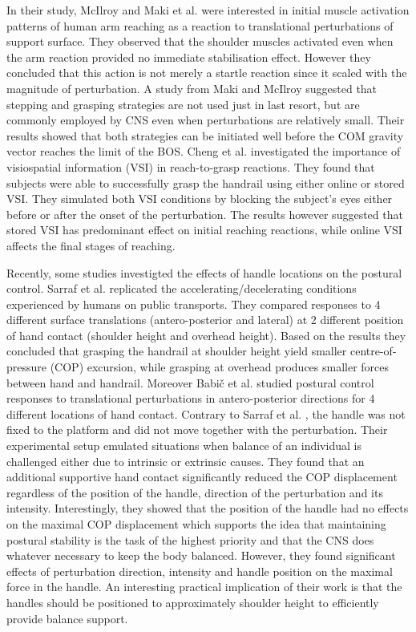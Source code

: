 \documentclass[12pt,a4paper,twoside]{article}
\begin{document}
In their study, McIlroy and Maki et al. \cite{Mcllroy1995b} were interested in initial muscle activation patterns of human arm reaching as a reaction to translational perturbations of support surface. They observed that the shoulder muscles activated even when the arm reaction provided no immediate stabilisation effect. However they concluded that this action is not merely a startle reaction since it scaled with the magnitude of perturbation. A study from Maki and McIlroy \cite{Maki1997} suggested that stepping and grasping strategies are not used just in last resort, but are commonly employed by CNS even when perturbations are relatively small. Their results showed that both strategies can be initiated well before the COM gravity vector reaches the limit of the BOS. Cheng et al. \cite{Cheng2012} investigated the importance of visiospatial information (VSI) in reach-to-grasp reactions. They found that subjects were able to successfully grasp the handrail using either online or stored VSI. They simulated both VSI conditions by blocking the subject's eyes either before or after the onset of the perturbation. The results however suggested that stored VSI has predominant effect on initial reaching reactions, while online VSI affects the final stages of reaching.

Recently, some studies investigted the effects of handle locations on the postural control. Sarraf et al. \cite{Sarraf2014} replicated the accelerating/decelerating conditions experienced by humans on public transports. They compared responses to 4 different surface translations (antero-posterior and lateral) at 2 different position of hand contact (shoulder height and overhead height). Based on the results they concluded that grasping the handrail at shoulder height yield smaller centre-of-pressure (COP) excursion, while grasping at overhead produces smaller forces between hand and handrail. Moreover Babič et al. \cite{Babic2014} studied postural control responses to translational perturbations in antero-posterior directions for 4 different locations of hand contact. Contrary to Sarraf et al. \cite{Sarraf2014}, the handle was not fixed to the platform and did not move together with the perturbation. Their experimental setup emulated situations when balance of an individual is challenged either due to intrinsic or extrinsic causes. They found that an additional supportive hand contact significantly reduced the COP displacement regardless of the position of the handle, direction of the perturbation and its intensity. Interestingly, they showed that the position of the handle had no effects on the maximal COP displacement which supports the idea that maintaining postural stability is the task of the highest priority and that the CNS does whatever necessary to keep the body balanced. However, they found significant effects of perturbation direction, intensity and handle position on the maximal force in the handle. An interesting practical implication of their work is that the handles should be positioned to approximately shoulder height to efficiently provide balance support.
\end{document}
